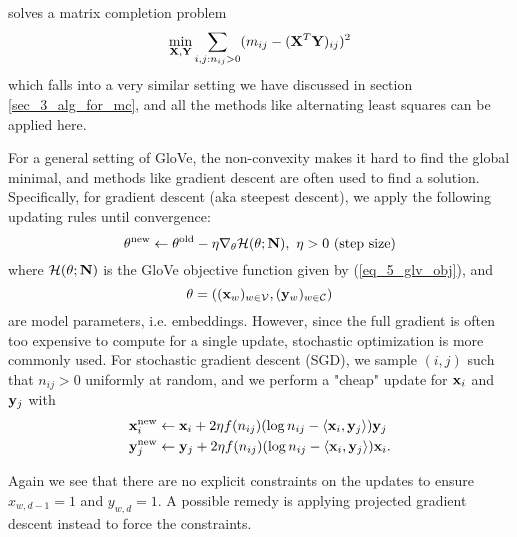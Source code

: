 \documentclass[../book-template.tex]{subfiles}
\begin{document}
solves a matrix completion problem
\begin{equation*}
	\min_{\bf X,Y} \sum_{i,j:n_{ij}>0} (m_{ij}-({\bf X}^T{\bf Y})_{ij})^2
\end{equation*}
which falls into a very similar setting we have discussed in section \ref{sec_3_alg_for_mc}, and all the methods like alternating least squares can be applied here.
\par For a general setting of GloVe, the non-convexity makes it hard to find the global minimal, and methods like gradient descent are often used to find a solution. Specifically, for gradient descent (aka steepest descent), we apply the following updating rules until convergence:
\begin{equation*}
	\theta^{\rm new}\leftarrow \theta^{\rm old}-\eta \nabla_{\theta}\mathcal{H}(\theta;{\bf N}),\ \eta>0\ (\text{step size})
\end{equation*}
where $\mathcal{H}(\theta;{\bf N})$ is the GloVe objective function given by (\ref{eq_5_glv_obj}), and 
\begin{equation*}
	\theta=(({\bf x}_w)_{w\in \mathcal{V}},({\bf y}_w)_{w\in \mathcal{C}})
\end{equation*}
are model parameters, i.e. embeddings. However, since the full gradient is often too expensive to compute for a single update, stochastic optimization is more commonly used. For stochastic gradient descent (SGD), we sample $(i,j)$ such that $n_{ij}>0$ uniformly at random, and we perform a "cheap" update for ${\bf x}_i$ and ${\bf y}_j$ with
\begin{align*}
	{\bf x}^{\rm new}_i &\leftarrow {\bf x}_i + 2\eta f(n_{ij})(\log n_{ij}-\langle {\bf x}_i,{\bf y}_j \rangle){\bf y}_j\\
	{\bf y}^{\rm new}_j &\leftarrow {\bf y}_j + 2\eta f(n_{ij})(\log n_{ij}-\langle {\bf x}_i,{\bf y}_j \rangle){\bf x}_i.
\end{align*}
\begin{remark}
	Again we see that there are no explicit constraints on the updates to ensure $x_{w,d-1}=1$ and $y_{w,d}=1$. A possible remedy is applying projected gradient descent instead to force the constraints.
\end{remark}
\end{document}
